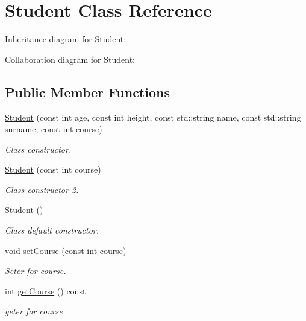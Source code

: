\hypertarget{classStudent}{}\section{Student Class Reference}
\label{classStudent}


Inheritance diagram for Student\+:


Collaboration diagram for Student\+:
\subsection*{Public Member Functions}
\begin{DoxyCompactItemize}
\item 
\hyperlink{classStudent_a0b9f4c8399cf35540091f2499023ff2c}{Student} (const int age, const int height, const std\+::string name, const std\+::string surname, const int course)
\begin{DoxyCompactList}\small\item\em Class constructor. \end{DoxyCompactList}\item 
\hyperlink{classStudent_a596f8938f4cea748edcc02e0bc155022}{Student} (const int course)
\begin{DoxyCompactList}\small\item\em Class constructor 2. \end{DoxyCompactList}\item 
\mbox{\label{classStudent_af9168cedbfa5565cf0b20c1a9d3f5c9d}} 
\hyperlink{classStudent_af9168cedbfa5565cf0b20c1a9d3f5c9d}{Student} ()
\begin{DoxyCompactList}\small\item\em Class default constructor. \end{DoxyCompactList}\item 
void \hyperlink{classStudent_a1e64e97ae728b602fedc7770661a05e6}{set\+Course} (const int course)
\begin{DoxyCompactList}\small\item\em Seter for course. \end{DoxyCompactList}\item 
\mbox{\label{classStudent_a7ca1414a43b0c0194defe9a7929567a2}} 
int \hyperlink{classStudent_a7ca1414a43b0c0194defe9a7929567a2}{get\+Course} () const
\begin{DoxyCompactList}\small\item\em geter for course \end{DoxyCompactList}\item 

\end{DoxyCompactItemize}
